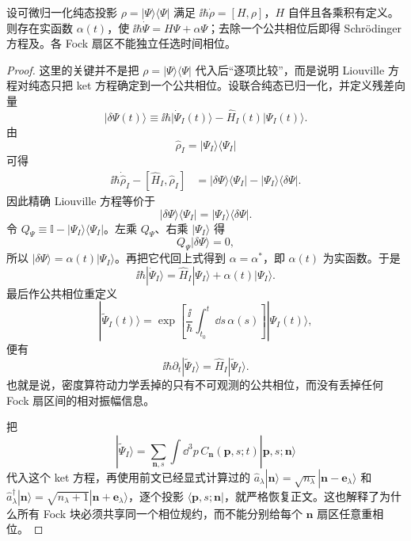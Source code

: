 \begin{lemma}
设可微归一化纯态投影 $\rho=|\Psi\rangle\langle\Psi|$ 满足 $\ii\hbar\dot\rho=[H,\rho]$，$H$ 自伴且各乘积有定义。则存在实函数 $\alpha(t)$，使 $\ii\hbar\dot\Psi=H\Psi+\alpha\Psi$；去除一个公共相位后即得 Schr\"odinger 方程及。各 Fock 扇区不能独立任选时间相位。
\end{lemma}
\begin{proof}
这里的关键并不是把 $\rho=|\Psi\rangle\langle\Psi|$ 代入后“逐项比较”，而是说明 Liouville 方程对纯态只把 ket 方程确定到一个公共相位。设联合纯态已归一化，并定义残差向量
\[
|\delta\Psi(t)\rangle
\equiv
\ii\hbar|\dot\Psi_I(t)\rangle
-\hat H_I(t)|\Psi_I(t)\rangle.
\]
由
\[
\hat\rho_I=|\Psi_I\rangle\langle\Psi_I|
\]
可得
\begin{align*}
\ii\hbar\dot{\hat\rho}_I-[\hat H_I,\hat\rho_I]
&=|\delta\Psi\rangle\langle\Psi_I|
-|\Psi_I\rangle\langle\delta\Psi|.
\end{align*}
因此精确 Liouville 方程等价于
\[
|\delta\Psi\rangle\langle\Psi_I|
=|\Psi_I\rangle\langle\delta\Psi|.
\]
令 $Q_\Psi\equiv\mathbb I-|\Psi_I\rangle\langle\Psi_I|$。左乘 $Q_\Psi$、右乘 $|\Psi_I\rangle$ 得
\[
Q_\Psi|\delta\Psi\rangle=0,
\]
所以 $|\delta\Psi\rangle=\alpha(t)|\Psi_I\rangle$。再把它代回上式得到 $\alpha=\alpha^*$，即 $\alpha(t)$ 为实函数。于是
\[
\ii\hbar|\dot\Psi_I\rangle
=\hat H_I|\Psi_I\rangle+\alpha(t)|\Psi_I\rangle.
\]
最后作公共相位重定义
\[
|\widetilde\Psi_I(t)\rangle
=\exp\!\left[
\frac{\ii}{\hbar}\int_{t_0}^{t}\dd s\,\alpha(s)
\right]
|\Psi_I(t)\rangle,
\]
便有
\[
\ii\hbar\partial_t|\widetilde\Psi_I\rangle
=\hat H_I|\widetilde\Psi_I\rangle.
\]
也就是说，密度算符动力学丢掉的只有不可观测的公共相位，而没有丢掉任何 Fock 扇区间的相对振幅信息。

把
\[
|\widetilde\Psi_I\rangle
=\sum_{\mathbf n,s}\int\dd^3p\,
C_{\mathbf n}(\mathbf p,s;t)
|\mathbf p,s;\mathbf n\rangle
\]
代入这个 ket 方程，再使用前文已经显式计算过的
$\hat a_\lambda|\mathbf n\rangle=\sqrt{n_\lambda}|\mathbf n-\mathbf e_\lambda\rangle$
和
$\hat a_\lambda^\dagger|\mathbf n\rangle=\sqrt{n_\lambda+1}|\mathbf n+\mathbf e_\lambda\rangle$，逐个投影 $\langle\mathbf p,s;\mathbf n|$，就严格恢复正文。这也解释了为什么所有 Fock 块必须共享同一个相位规约，而不能分别给每个 $\mathbf n$ 扇区任意重相位。
\end{proof}


